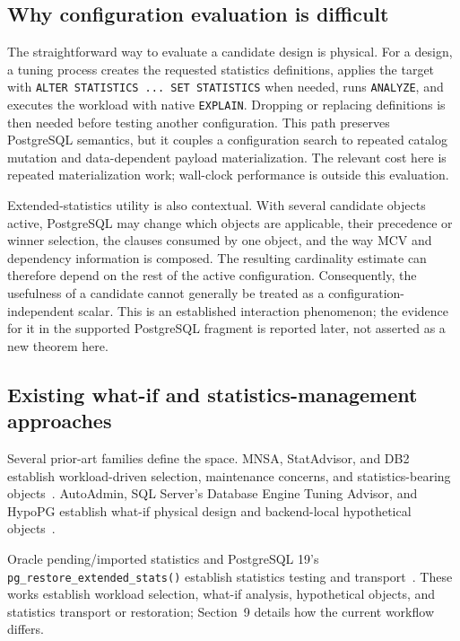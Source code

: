 \subsection{Why configuration evaluation is difficult}

The straightforward way to evaluate a candidate design is physical.  For a
design, a tuning process creates the requested statistics definitions, applies
the target with \texttt{ALTER STATISTICS ... SET STATISTICS} when needed, runs
\texttt{ANALYZE}, and executes the workload with native \texttt{EXPLAIN}.
Dropping or replacing definitions is then needed before testing another
configuration.  This path preserves PostgreSQL semantics, but it couples a
configuration search to repeated catalog mutation and data-dependent payload
  materialization.  The relevant cost here is repeated materialization work;
  wall-clock performance is outside this evaluation.

Extended-statistics utility is also contextual.  With several candidate
objects active, PostgreSQL may change which objects are applicable, their
precedence or winner selection, the clauses consumed by one object, and the
way MCV and dependency information is composed.  The resulting cardinality
estimate can therefore depend on the rest of the active configuration.
Consequently, the usefulness of a candidate cannot generally be treated as a
configuration-independent scalar.  This is an established interaction
phenomenon; the evidence for it in the supported PostgreSQL fragment is
reported later, not asserted as a new theorem here.

\subsection{Existing what-if and statistics-management approaches}

Several prior-art families define the space.  MNSA, StatAdvisor, and DB2
establish workload-driven selection, maintenance concerns, and
statistics-bearing objects~\cite{chaudhuri2001statistics,elhelw2009statadvisor,db2statviews}.
AutoAdmin, SQL Server's Database Engine
Tuning Advisor, and HypoPG establish what-if physical design and backend-local
hypothetical objects~\cite{chaudhuri1998whatif,microsoftdta,hypopg}.

Oracle pending/imported statistics and PostgreSQL 19's
\texttt{pg\_restore\_extended\_stats()} establish statistics testing and
transport~\cite{oraclependingstats,oracleimportstats,postgresql19restore}.
These works establish workload selection, what-if analysis, hypothetical
objects, and statistics transport or restoration; Section~9 details how the
current workflow differs.

